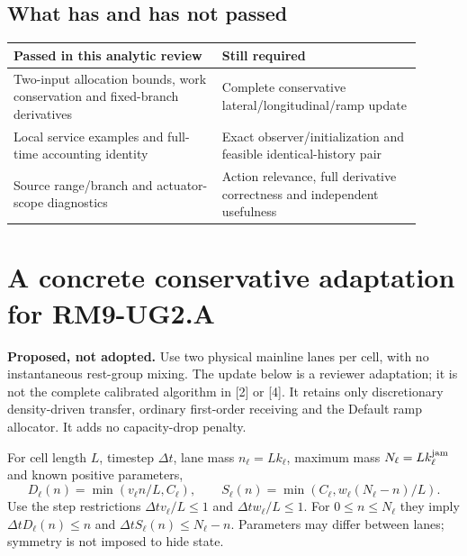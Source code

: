 \documentclass[10pt,a4paper]{article}
\begin{document}
\subsection*{What has and has not passed}
\begin{center}
\begin{tabular}{>{\raggedright\arraybackslash}p{0.46\linewidth}>{\raggedright\arraybackslash}p{0.44\linewidth}}
\toprule
Passed in this analytic review & Still required\\
\midrule
Two-input allocation bounds, work conservation and fixed-branch derivatives
& Complete conservative lateral/longitudinal/ramp update\\
Local service examples and full-time accounting identity
& Exact observer/initialization and feasible identical-history pair\\
Source range/branch and actuator-scope diagnostics
& Action relevance, full derivative correctness and independent usefulness\\
\bottomrule
\end{tabular}
\end{center}
\newpage

\section{A concrete conservative adaptation for RM9-UG2.A}\label{sec:proposal}
\noindent\textbf{Proposed, not adopted.} Use two physical mainline lanes per
cell, with no instantaneous rest-group mixing. The update below is a reviewer
adaptation; it is not the complete calibrated algorithm in [2] or [4].
It retains only discretionary density-driven transfer, ordinary first-order
receiving and the Default ramp allocator. It adds no capacity-drop penalty.

For cell length $L$, timestep $\Delta t$, lane mass $n_\ell=Lk_\ell$,
maximum mass $N_\ell=Lk_\ell^{\rm jam}$ and known positive parameters,
\begin{equation}
 D_\ell(n)=\min(v_\ell n/L,C_\ell),\qquad
 S_\ell(n)=\min(C_\ell,w_\ell(N_\ell-n)/L).
\end{equation}
Use the step restrictions $\Delta t v_\ell/L\leq1$ and
$\Delta t w_\ell/L\leq1$. For $0\leq n\leq N_\ell$ they imply
$\Delta t D_\ell(n)\leq n$ and $\Delta t S_\ell(n)\leq N_\ell-n$.
Parameters may differ between lanes; symmetry is not imposed to hide state.
\end{document}
